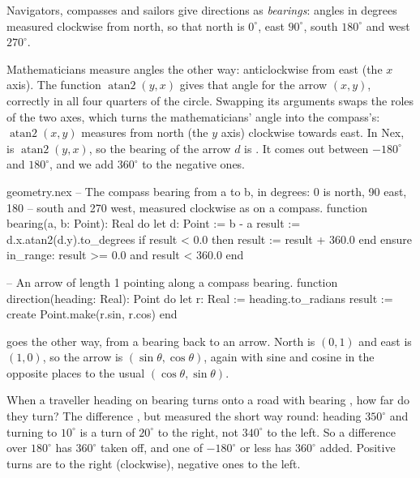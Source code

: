 Navigators, compasses and sailors give directions as \emph{bearings}:
angles in degrees measured clockwise from north, so that north is
$0^\circ$, east $90^\circ$, south $180^\circ$ and west $270^\circ$.

Mathematicians measure angles the other way: anticlockwise from east (the
$x$ axis). The function $\operatorname{atan2}(y, x)$ gives that angle for
the arrow $(x, y)$, correctly in all four quarters of the circle. Swapping
its arguments swaps the roles of the two axes, which turns the
mathematicians' angle into the compass's: $\operatorname{atan2}(x, y)$
measures from north (the $y$ axis) clockwise towards east. In Nex,
 is $\operatorname{atan2}(y, x)$, so the bearing of the
arrow $d$ is . It comes out between $-180^\circ$ and
$180^\circ$, and we add $360^\circ$ to the negative ones.

\begin{append}{geometry.nex}
-- The compass bearing from a to b, in degrees: 0 is north, 90 east, 180
-- south and 270 west, measured clockwise as on a compass.
function bearing(a, b: Point): Real do
  let d: Point := b - a
  result := d.x.atan2(d.y).to_degrees
  if result < 0.0 then
    result := result + 360.0
  end
ensure
  in_range: result >= 0.0 and result < 360.0
end

-- An arrow of length 1 pointing along a compass bearing.
function direction(heading: Real): Point do
  let r: Real := heading.to_radians
  result := create Point.make(r.sin, r.cos)
end
\end{append}

 goes the other way, from a bearing back to an arrow. North
is $(0, 1)$ and east is $(1, 0)$, so the arrow is
$(\sin\theta, \cos\theta)$, again with sine and cosine in the opposite
places to the usual $(\cos\theta, \sin\theta)$.

When a traveller heading on bearing  turns onto a road with
bearing , how far do they turn? The difference
, but measured the short way round: heading
$350^\circ$ and turning to $10^\circ$ is a turn of $20^\circ$ to the
right, not $340^\circ$ to the left. So a difference over $180^\circ$ has
$360^\circ$ taken off, and one of $-180^\circ$ or less has $360^\circ$
added. Positive turns are to the right (clockwise), negative ones to the
left.

